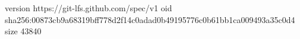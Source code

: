 version https://git-lfs.github.com/spec/v1
oid sha256:00873cb9a68319bff778d2f14c0adad0b49195776c0b61bb1ca009493a35c0d4
size 43840
